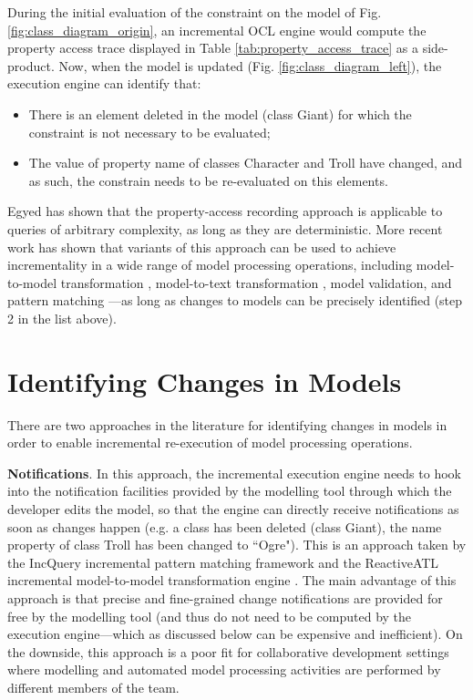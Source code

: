 During the initial evaluation of the constraint on the model of Fig. \ref{fig:class_diagram_origin}, an incremental OCL engine would compute the property access trace displayed in Table \ref{tab:property_access_trace} as a side-product. Now, when the model is updated (Fig. \ref{fig:class_diagram_left}), the execution engine can identify that:

\begin{itemize}
    \item There is an element deleted in the model (class \textsf{Giant}) for which the constraint is not necessary to be evaluated;
    \item The value of property \textsf{name} of classes \textsf{Character} and \textsf{Troll} have changed, and as such, the constrain needs to be re-evaluated on this elements.
\end{itemize}

Egyed has shown that the property-access recording approach is applicable to queries of arbitrary complexity, 
as long as they are deterministic. More recent work has shown that variants of this approach can be used to 
achieve incrementality in a wide range of model processing operations, including model-to-model 
transformation \cite{jouault2010towards}, model-to-text transformation \cite{DBLP:conf/ecmdafa/OgunyomiRK15}, 
model validation, and pattern matching \cite{DBLP:conf/ecmdafa/RathHV12}---as long as changes to models can be 
precisely identified (step 2 in the list above).

\section{Identifying Changes in Models}
\label{sec:identifying_changes_in models}
There are two approaches in the literature for identifying changes in models in order to enable incremental re-execution of model processing operations.

\textbf{Notifications}. In this approach, the incremental execution engine needs to hook into the notification facilities provided by the modelling tool through which the developer edits the model, so that the engine can directly receive notifications as soon as changes happen (e.g. a class has been deleted (class \textsf{Giant}), the name property of class \textsf{Troll} has been changed to ``Ogre"). This is an approach taken by the IncQuery incremental pattern matching framework \cite{DBLP:conf/ecmdafa/RathHV12} and the ReactiveATL incremental model-to-model transformation engine \cite{DBLP:conf/ecmdafa/OgunyomiRK15}. The main advantage of this approach is that precise and fine-grained change notifications are provided for free by the modelling tool (and thus do not need to be computed by the execution engine---which as discussed below can be expensive and inefficient). On the downside, this approach is a poor fit for collaborative development settings where modelling and automated model processing activities are performed by different members of the team.

